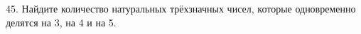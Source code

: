 45. Найдите количество натуральных трёхзначных чисел, которые одновременно делятся на 3, на 4 и на 5.\\
